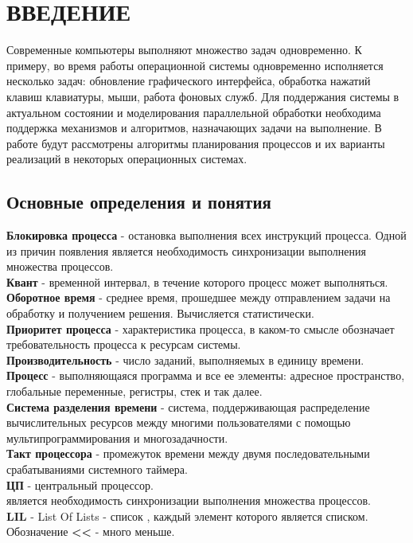 \newpage

\section*{ВВЕДЕНИЕ}
Современные компьютеры выполняют множество задач одновременно. К примеру, во время работы операционной системы одновременно исполняется несколько задач: обновление графического интерфейса, обработка нажатий клавиш клавиатуры, мыши, работа фоновых служб. Для поддержания системы в актуальном состоянии и моделирования параллельной обработки необходима поддержка механизмов и алгоритмов, назначающих задачи на выполнение. В работе будут рассмотрены алгоритмы планирования процессов и их варианты реализаций в некоторых операционных системах. 
 
\subsection*{Основные определения и понятия}
\label{defs}
\textbf{Блокировка процесса} - остановка выполнения всех инструкций процесса. Одной
из причин появления является необходимость синхронизации выполнения
множества процессов.\\
\textbf{Квант} - временной интервал, в течение которого процесс может выполняться.\\
\textbf{Оборотное время} - среднее время, прошедшее между отправлением задачи на обработку и получением решения. Вычисляется статистически.\\
\textbf{Приоритет процесса} - характеристика процесса, в каком-то смысле обозначает требовательность процесса к ресурсам системы.\\
\textbf{Производительность} - число заданий, выполняемых в единицу времени.\\
\textbf{Процесс} - выполняющаяся программа и все ее элементы: адресное пространство, глобальные переменные, регистры, стек и так далее.\\
\textbf{Система разделения времени} - система, поддерживающая распределение вычислительных ресурсов между многими пользователями с помощью мультипрограммирования и многозадачности.\\
\textbf{Такт процессора} - промежуток времени между двумя последовательными срабатываниями системного таймера.\\
\textbf{ЦП} - центральный процессор.\\ 
является необходимость синхронизации выполнения множества процессов.\\
\textbf{LIL} - List Of Lists - список , каждый элемент которого является списком.\\
Обозначение \textbf{<<} - много меньше.

